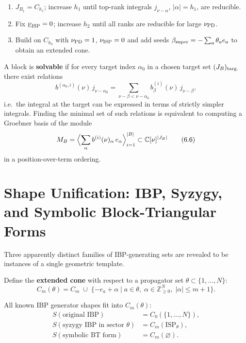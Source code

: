\documentclass[12pt]{article}
\newcommand{\Z}{\mathbb{Z}}
\begin{document}
\begin{enumerate}
  \item[$B_1$ (high rank):] $J_{B_1}=C_{h_1}$; increase $h_1$ until top-rank
        integrals $j_{\nu-\alpha}$, $|\alpha|=h_1$, are reducible.
  \item[$B_2$ (middle rank):] Fix $\underline\nu_{\rm ISP}=0$; increase $h_2$
        until all ranks are reducible for large $\nu_{\rm PD}$.
  \item[$B_3$ (near-corner):] Build on $C_{h_3}$ with
        $\nu_{\rm PD}=1$, $\nu_{\rm ISP}=0$ and add seeds
        $\beta_{\rm super}=-\sum_a\theta_a e_a$ to obtain an extended cone.
\end{enumerate}

A block is \textbf{solvable} if for every target index $\alpha_0$ in a chosen
target set $(J_B)_{\rm targ.}$ there exist relations
\[
  b^{(\alpha_0,i)}(\nu)\,j_{\nu-\alpha_0}
  = \sum_{\nu-\beta<\nu-\alpha_0} b_{\beta}^{(i)}(\nu)\,j_{\nu-\beta},
\tag{6.5}\label{eq:solvable_block}
\]
i.e.\ the integral at the target can be expressed in terms of strictly simpler
integrals.  Finding the minimal set of such relations is equivalent to computing
a Groebner basis of the module
\[
  M_B = \Bigl\langle\sum_{\alpha}b^{(i)}(\nu)_{\alpha}\,e_{\alpha}
                \Bigr\rangle_{i=1}^{|B|}
        \subset \mathbb C[\nu]^{|J_B|}
\tag{6.6}\label{eq:module_gb}
\]
in a position-over-term ordering.

\section{Shape Unification: IBP, Syzygy, and Symbolic Block-Triangular Forms}\label{sec:shapes}

Three apparently distinct families of IBP-generating sets are revealed to be
instances of a single geometric template.

Define the \textbf{extended cone} with respect to a propagator set
$\theta\subset\{1,\ldots,N\}$:
\[
  C_m(\theta) =
  C_m \;\cup\;
  \{-e_a+\alpha \mid a\in\theta,\;\alpha\in\Z_{\ge0}^N,\;|\alpha|\le m+1\} .
\tag{7.1}\label{eq:extended_cone}
\]

All known IBP generator shapes fit into $C_m(\theta)$:
\[
\begin{aligned}
  S(\text{original IBP}) &= C_0(\{1,\ldots,N\}),\\
  S(\text{syzygy IBP in sector }\theta) &= C_m(\text{ISP}_{\theta}),\\
  S(\text{symbolic BT form}) &= C_m(\varnothing).
\end{aligned}
\tag{7.2}\label{eq:shape_family}
\]
\end{document}
